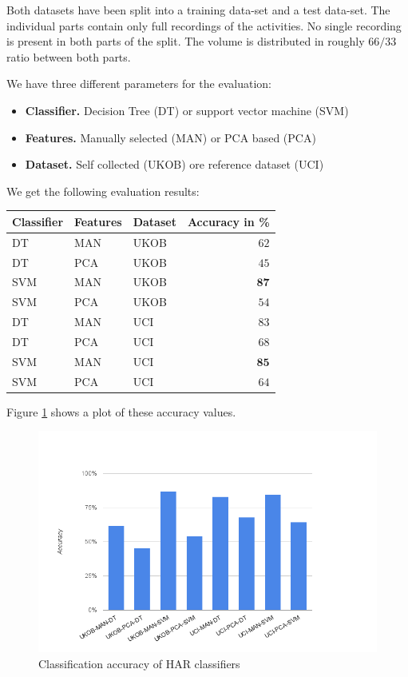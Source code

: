 Both datasets have been split into a training data-set and a test
data-set. The individual parts contain only full recordings of the
activities. No single recording is present in both parts of the
split. The volume is distributed in roughly $66/33$ ratio between
both parts.

We have three different parameters for the evaluation:
\begin{itemize}
\item {\bf Classifier.} Decision Tree (DT) or support vector machine (SVM)
\item {\bf Features.} Manually selected (MAN) or PCA based (PCA)
\item {\bf Dataset.} Self collected (UKOB) ore reference dataset (UCI)
\end{itemize}

We get the following evaluation results:
\begin{center}
\begin{tabular}{|lll|r|} \hline
  {\bf Classifier} & {\bf Features} & {\bf Dataset} & {\bf Accuracy in \%} \\ \hline
  DT	& MAN	& UKOB	&	$62$ \\ 
  DT	& PCA	& UKOB	&	$45$\\ 
  SVM	& MAN	& UKOB	& 	$\mathbf{87}$\\ 
  SVM	& PCA	& UKOB	&	$54$\\
  DT	& MAN	& UCI	&	$83$ \\ 
  DT	& PCA	& UCI	&	$68$ \\ 
  SVM	& MAN	& UCI	& 	$\mathbf{ 85 }$ \\ 
  SVM	& PCA	& UCI	&	$64$ \\ \hline
\end{tabular}
\end{center}

Figure \ref{fig:har_eval} shows a plot of these accuracy values.
\begin{figure}[ht]
  \centering
  \includegraphics[width= 0.6 \textwidth]{img/har/accuracy_plot.png}
  \caption{Classification accuracy of HAR classifiers}
  \label{fig:har_eval}
\end{figure}

